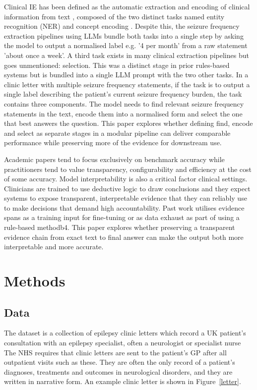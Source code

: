 \documentclass[conference]{IEEEtran}
\begin{document}
Clinical IE has been defined as the automatic extraction 
and encoding of clinical information from text \cite{b13}, 
composed of the two distinct tasks named entity recognition 
(NER) and concept encoding \cite{b14}. Despite this, the
seizure frequency extraction pipelines using LLMs bundle 
both tasks into a single step by asking the model to output 
a normalised label e.g. '4 per month' from a raw statement 
'about once a week'. A third task exists in many clinical 
extraction pipelines but goes unmentioned: selection. This
was a distinct stage in prior rules-based systems\cite{b15} but is
bundled into a single LLM prompt with the two other tasks. In 
a clinic letter with multiple seizure frequency statements,
if the task is to output a single label describing the patient's
current seizure frequency burden, the task contains
three components. The model needs to find relevant 
seizure frequency statements in the text, encode them 
into a normalised form and select the one that best 
answers the question. This paper explores whether defining
find, encode and select as separate stages in a modular 
pipeline can deliver comparable performance while 
preserving more of the evidence for downstream use.

Academic papers tend to focus exclusively on benchmark 
accuracy while practitioners tend to value transparency, 
configurability and efficiency at the cost of some accuracy\cite{b15}. 
Model interpretability is also a critical factor clinical settings\cite{b14}. 
Clinicians are trained to use deductive logic to draw 
conclusions and they expect systems to expose transparent, 
interpretable evidence that they can reliably use to make 
decisions that demand high accountability. Past work 
utilises evidence spans as a training input\cite{b3} for 
fine-tuning or as data exhaust as part of using a rule-based 
method{b4}. This paper explores whether preserving a 
transparent evidence chain from exact text to final answer 
can make the output both more interpretable and more 
accurate.

\section{Methods}
\subsection{Data}

The dataset is a collection of epilepsy clinic letters which 
record a UK patient's consultation with an epilepsy 
specialist, often a neurologist or specialist nurse \cite{b3} 
The NHS requires that clinic letters are sent to the 
patient's GP after all outpatient visits such as these.
They are often the only record of a patient's diagnoses,
treatments and outcomes in neurological disorders, 
and they are written in narrative form. An example clinic letter 
is shown in Figure~\ref{letter}.
\end{document}
